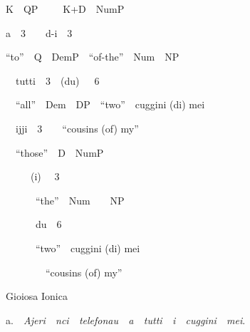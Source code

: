 \documentclass[output=paper,modfonts,nonflat]{langsci/langscibook}
\begin{document}
\begin{styleStandard}
\ \ K\ \ QP\ \ \ \  \ K+D\ \ NumP
\end{styleStandard}

\begin{styleStandard}
\ \ a\ \ 3\ \ \ \  d-i\ \ 3
\end{styleStandard}

\begin{styleStandard}
\ \ “to”\ \ Q\ \ DemP\ \ “of-the”\ \ Num\ \  NP
\end{styleStandard}

\begin{styleStandard}
\ \ \ \ tutti\ \ 3\ \  (du)\ \  \ 6
\end{styleStandard}

\begin{styleStandard}
\ \ \ \ “all”\ \ Dem\ \ DP\ \ “two”\ \ cuggini (di) mei
\end{styleStandard}

\begin{styleStandard}
\ \ \ \  ijji\ \ 3\ \ \ \ “cousins (of) my”
\end{styleStandard}

\begin{styleStandard}
\ \ \ \ “those”\ \ D\ \ NumP
\end{styleStandard}

\begin{styleStandard}
\ \ \ \ \ \  \ (i) \ \ 3
\end{styleStandard}

\begin{styleStandard}
\ \ \ \ \ \ \ \ “the”\ \ Num\ \ \ \ NP
\end{styleStandard}

\begin{styleStandard}
\ \ \ \ \ \ \ \  du\ \ 6
\end{styleStandard}

\begin{styleStandard}
\ \ \ \ \ \ \ \ “two”\ \ cuggini (di) mei
\end{styleStandard}

\begin{styleStandard}
\ \ \ \ \ \ \ \ \ \ “cousins (of) my”
\end{styleStandard}

\begin{listWWNumviiileveli}
\item 
\begin{styleListParagraph}
\ \ Gioiosa Ionica
\end{styleListParagraph}
\end{listWWNumviiileveli}
\begin{styleListParagraph}
\ \ a.\ \ \textit{Ajeri\ \ nci\ \ telefonau\ \ a\ \ tutti\ \ i\ \ cuggini\ \ mei}.
\end{styleListParagraph}
\end{document}

